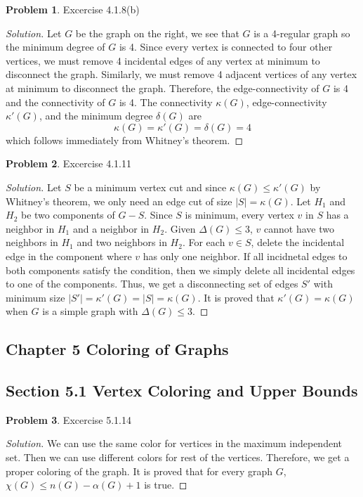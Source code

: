 \documentclass[12pt]{article}
\theoremstyle{definition}
\newtheorem{problem}{Problem}
\newenvironment*{solution}{\begin{proof}[Solution]}{\end{proof}}
\begin{document}
\begin{problem}
    Excercise 4.1.8(b)
\end{problem}
\begin{solution}
    Let \(G\) be the graph on the right, we see that \(G\) is a 4-regular
    graph so the minimum degree of \(G\) is 4.
    Since every vertex is connected to four other vertices,
    we must remove 4 incidental edges of any vertex at minimum to disconnect
    the graph.
    Similarly, we must remove 4 adjacent vertices of any vertex at minimum to
    disconnect the graph.
    Therefore, the edge-connectivity of \(G\) is 4 and the connectivity of
    \(G\) is 4.
    The connectivity \(\kappa(G)\), edge-connectivity \(\kappa'(G)\), and the
    minimum degree \(\delta(G)\) are
    \[\kappa(G) = \kappa'(G) = \delta(G) = 4\] which follows immediately from
    Whitney's theorem.
\end{solution}

\begin{problem}
    Excercise 4.1.11
\end{problem}
\begin{solution}
    Let \(S\) be a minimum vertex cut and since \(\kappa(G)\leq\kappa'(G)\) by
    Whitney's theorem, we only need an edge cut of size \(|S|=\kappa(G)\).
    Let \(H_1\) and \(H_2\) be two components of \(G-S\).
    Since \(S\) is minimum, every vertex \(v\) in \(S\) has a neighbor in \(H_1\)
    and a neighbor in \(H_2\).
    Given \(\Delta(G)\leq3\), \(v\) cannot have two neighbors in \(H_1\) and two
    neighbors in \(H_2\).
    For each \(v\in S\), delete the incidental edge in the component where
    \(v\) has only one neighbor.
    If all incidnetal edges to both components satisfy the condition, then we
    simply delete all incidental edges to one of the components.
    Thus, we get a disconnecting set of edges \(S'\) with minimum size
    \(|S'|=\kappa'(G)=|S|=\kappa(G)\).
    It is proved that \(\kappa'(G)=\kappa(G)\) when \(G\) is a simple graph
    with \(\Delta(G)\leq3\).
\end{solution}

\subsection*{Chapter 5 Coloring of Graphs}
\subsection*{Section 5.1 Vertex Coloring and Upper Bounds}
\begin{problem}
    Excercise 5.1.14
\end{problem}
\begin{solution}
    We can use the same color for vertices in the maximum independent set.
    Then we can use different colors for rest of the vertices.
    Therefore, we get a proper coloring of the graph.
    It is proved that for every graph \(G\), \(\chi(G) \leq n(G)-\alpha(G)+1\)
    is true.
\end{solution}
\end{document}

